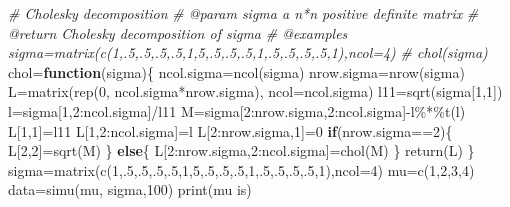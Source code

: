 \documentclass[
]{article}
\newenvironment{Shaded}{\begin{snugshade}}{\end{snugshade}}
\newcommand{\AttributeTok}[1]{\textcolor[rgb]{0.77,0.63,0.00}{#1}}
\newcommand{\CommentTok}[1]{\textcolor[rgb]{0.56,0.35,0.01}{\textit{#1}}}
\newcommand{\ControlFlowTok}[1]{\textcolor[rgb]{0.13,0.29,0.53}{\textbf{#1}}}
\newcommand{\DecValTok}[1]{\textcolor[rgb]{0.00,0.00,0.81}{#1}}
\newcommand{\FunctionTok}[1]{\textcolor[rgb]{0.00,0.00,0.00}{#1}}
\newcommand{\NormalTok}[1]{#1}
\newcommand{\OtherTok}[1]{\textcolor[rgb]{0.56,0.35,0.01}{#1}}
\newcommand{\SpecialCharTok}[1]{\textcolor[rgb]{0.00,0.00,0.00}{#1}}
\newcommand{\StringTok}[1]{\textcolor[rgb]{0.31,0.60,0.02}{#1}}
\begin{document}
\begin{Shaded}
\begin{Highlighting}[]
\CommentTok{\#\textquotesingle{} Cholesky decomposition}
\CommentTok{\#\textquotesingle{} @param sigma a n*n positive definite matrix}
\CommentTok{\#\textquotesingle{} @return Cholesky decomposition of sigma}
\CommentTok{\#\textquotesingle{} @examples sigma=matrix(c(1,.5,.5,.5,.5,1,5,.5,.5,.5,1,.5,.5,.5,.5,1),ncol=4)}
\CommentTok{\#\textquotesingle{} chol(sigma)}
\NormalTok{chol}\OtherTok{=}\ControlFlowTok{function}\NormalTok{(sigma)\{}
\NormalTok{  ncol.sigma}\OtherTok{=}\FunctionTok{ncol}\NormalTok{(sigma)}
\NormalTok{  nrow.sigma}\OtherTok{=}\FunctionTok{nrow}\NormalTok{(sigma)}
\NormalTok{  L}\OtherTok{=}\FunctionTok{matrix}\NormalTok{(}\FunctionTok{rep}\NormalTok{(}\DecValTok{0}\NormalTok{,}
\NormalTok{               ncol.sigma}\SpecialCharTok{*}\NormalTok{nrow.sigma),}
           \AttributeTok{ncol=}\NormalTok{ncol.sigma)}
\NormalTok{  l11}\OtherTok{=}\FunctionTok{sqrt}\NormalTok{(sigma[}\DecValTok{1}\NormalTok{,}\DecValTok{1}\NormalTok{])}
\NormalTok{  l}\OtherTok{=}\NormalTok{sigma[}\DecValTok{1}\NormalTok{,}\DecValTok{2}\SpecialCharTok{:}\NormalTok{ncol.sigma]}\SpecialCharTok{/}\NormalTok{l11}
\NormalTok{  M}\OtherTok{=}\NormalTok{sigma[}\DecValTok{2}\SpecialCharTok{:}\NormalTok{nrow.sigma,}\DecValTok{2}\SpecialCharTok{:}\NormalTok{ncol.sigma]}\SpecialCharTok{{-}}\NormalTok{l}\SpecialCharTok{\%*\%}\FunctionTok{t}\NormalTok{(l)}
\NormalTok{  L[}\DecValTok{1}\NormalTok{,}\DecValTok{1}\NormalTok{]}\OtherTok{=}\NormalTok{l11}
\NormalTok{  L[}\DecValTok{1}\NormalTok{,}\DecValTok{2}\SpecialCharTok{:}\NormalTok{ncol.sigma]}\OtherTok{=}\NormalTok{l}
\NormalTok{  L[}\DecValTok{2}\SpecialCharTok{:}\NormalTok{nrow.sigma,}\DecValTok{1}\NormalTok{]}\OtherTok{=}\DecValTok{0}
  \ControlFlowTok{if}\NormalTok{(nrow.sigma}\SpecialCharTok{==}\DecValTok{2}\NormalTok{)\{}
\NormalTok{    L[}\DecValTok{2}\NormalTok{,}\DecValTok{2}\NormalTok{]}\OtherTok{=}\FunctionTok{sqrt}\NormalTok{(M)}
\NormalTok{  \}}
  \ControlFlowTok{else}\NormalTok{\{}
\NormalTok{    L[}\DecValTok{2}\SpecialCharTok{:}\NormalTok{nrow.sigma,}\DecValTok{2}\SpecialCharTok{:}\NormalTok{ncol.sigma]}\OtherTok{=}\FunctionTok{chol}\NormalTok{(M)}
\NormalTok{  \}}
  \FunctionTok{return}\NormalTok{(L)}
\NormalTok{\}}
\NormalTok{sigma}\OtherTok{=}\FunctionTok{matrix}\NormalTok{(}\FunctionTok{c}\NormalTok{(}\DecValTok{1}\NormalTok{,.}\DecValTok{5}\NormalTok{,.}\DecValTok{5}\NormalTok{,.}\DecValTok{5}\NormalTok{,.}\DecValTok{5}\NormalTok{,}\DecValTok{1}\NormalTok{,}\DecValTok{5}\NormalTok{,.}\DecValTok{5}\NormalTok{,.}\DecValTok{5}\NormalTok{,.}\DecValTok{5}\NormalTok{,}\DecValTok{1}\NormalTok{,.}\DecValTok{5}\NormalTok{,.}\DecValTok{5}\NormalTok{,.}\DecValTok{5}\NormalTok{,.}\DecValTok{5}\NormalTok{,}\DecValTok{1}\NormalTok{),}\AttributeTok{ncol=}\DecValTok{4}\NormalTok{)}
\NormalTok{mu}\OtherTok{=}\FunctionTok{c}\NormalTok{(}\DecValTok{1}\NormalTok{,}\DecValTok{2}\NormalTok{,}\DecValTok{3}\NormalTok{,}\DecValTok{4}\NormalTok{)}
\NormalTok{data}\OtherTok{=}\FunctionTok{simu}\NormalTok{(mu, sigma,}\DecValTok{100}\NormalTok{)}
\FunctionTok{print}\NormalTok{(}\StringTok{\textquotesingle{}mu is\textquotesingle{}}\NormalTok{)}
\end{Highlighting}
\end{Shaded}
\end{document}
